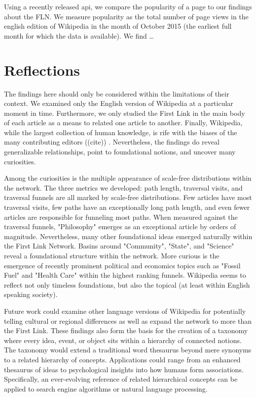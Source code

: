 \documentclass[pre,twocolumn,twoside,superscriptaddress,floatfix, aps, 10pt]{revtex4-1}
\begin{document}
Using a recently released api, we compare the popularity of a page to our 
findings about the FLN. We measure popularity as the total number 
of page views in the english edition of Wikipedia in the month of 
October 2015 (the earliest full month for which the data is available). 
We find \dots


\section{Reflections}

The findings here should only be considered within the limitations of their context.
We examined only the English version of Wikipedia at a particular moment in time.
Furthermore, we only studied the First Link in the main body  of each article
as a means to related one article to another. Finally, Wikipedia, while the largest 
collection of human knowledge, is rife with the biases of the many contributing editors ((cite))
. Nevertheless, the findings do reveal
generalizable relationships, point to foundational notions, and uncover many curiosities.


Among the curiosities is the multiple appearance of scale-free distributions within the network. 
The three metrics we developed: path length, traversal visits, and traversal funnels are all marked 
by scale-free distributions. Few articles have most traversal visits, few paths have an exceptionally long path length, and even fewer
articles are responsible for funneling most paths. When measured against the traversal funnels, 
"Philosophy" emerges as an exceptional article by orders of magnitude. 
Nevertheless, many other foundational ideas emerged naturally within the First Link Network. 
Basins around "Community", "State", and "Science" reveal a foundational structure within the network. 
More curious is the emergence of recently prominent political and economics topics such as "Fossil Fuel" and "Health Care" 
within the highest ranking funnels. 
Wikipedia seems to reflect not only timeless foundations, but also the topical (at least within English speaking society).

Future work could examine other language versions of Wikipedia for potentially telling cultural or regional differences as well as expand the network to more than the First Link.
These findings also form the basis for the creation of a taxonomy where 
every idea, event, or object sits within a hierarchy of connected notions.
The taxonomy would extend a traditional word thesaurus beyond mere synonyms to a related hierarchy of concepts.
Applications could range from an enhanced thesaurus of ideas to psychological insights into how humans form associations.
Specifically, an ever-evolving reference of related hierarchical concepts can be applied to search engine algorithms 
or natural language processing.
\end{document}
